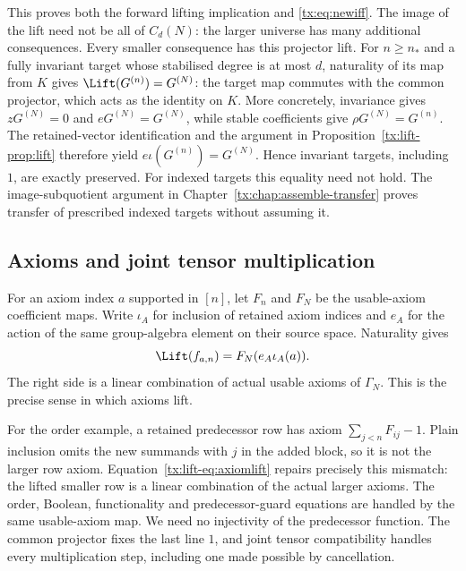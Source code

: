 This proves both the forward lifting implication and
\eqref{tx:eq:newiff}. The image of the lift need not be all of $C_d(N)$:
the larger universe has many additional consequences. Every smaller consequence has this projector lift. For $n\ge n_*$ and a fully invariant target whose stabilised degree
is at most $d$, naturality of its map from $K$ gives
$\Lift(G^{(n)})=G^{(N)}$: the target map commutes with the common projector,
which acts as the identity on $K$. More concretely, invariance gives
$zG^{(N)}=0$ and $eG^{(N)}=G^{(N)}$, while stable coefficients give
$\rho G^{(N)}=G^{(n)}$. The retained-vector identification and the argument
in Proposition~\ref{tx:lift-prop:lift} therefore yield $e\iota(G^{(n)})=G^{(N)}$. Hence invariant targets, including
$1$, are exactly preserved. For indexed targets this equality need
not hold. The image-subquotient argument in
Chapter~\ref{tx:chap:assemble-transfer} proves transfer of
prescribed indexed targets without assuming it.

\subsection{Axioms and joint tensor multiplication}
For an axiom index $a$ supported in $[n]$, let $F_n$ and $F_N$ be the
usable-axiom coefficient maps. Write $\iota_A$ for inclusion of retained
axiom indices and $e_A$ for the action of the same group-algebra element
on their source space. Naturality gives
\begin{equation}\label{tx:lift-eq:axiomlift}
             \Lift(f_{a,n})=F_N(e_A\iota_A(a)).
\end{equation}
The right side is a linear combination of actual usable axioms of
$\Gamma_N$. This is the precise sense in which axioms lift.

For the order example, a retained predecessor row has axiom
$\sum_{j<n}F_{ij}-1$. Plain inclusion omits the new summands with
$j$ in the added block, so it is not the larger row axiom.
Equation~\eqref{tx:lift-eq:axiomlift} repairs precisely this mismatch:
the lifted smaller row is a linear combination of the actual larger
axioms. The order, Boolean, functionality and predecessor-guard
equations are handled by the same usable-axiom map. We need no
injectivity of the predecessor function. The common projector fixes
the last line $1$, and joint tensor compatibility handles every
multiplication step, including one made possible by cancellation.

